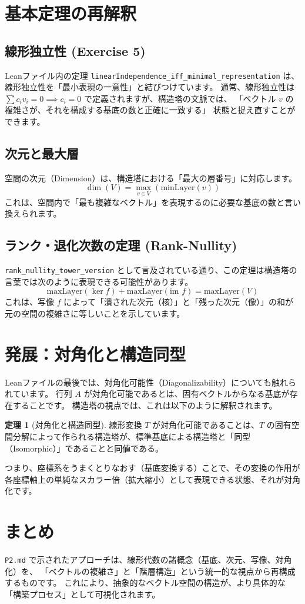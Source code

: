 \documentclass[judge=standard,11pt]{jlreq}
\theoremstyle{definition}
\newtheorem{theorem}[definition]{定理}
\newcommand{\minLayer}{\text{minLayer}}
\begin{document}
\section{基本定理の再解釈}

\subsection{線形独立性 (Exercise 5)}
Leanファイル内の定理 \texttt{linearIndependence\_iff\_minimal\_representation} は、線形独立性を「最小表現の一意性」と結びつけています。
通常、線形独立性は $\sum c_i v_i = 0 \implies c_i = 0$ で定義されますが、構造塔の文脈では、
「ベクトル $v$ の複雑さが、それを構成する基底の数と正確に一致する」
状態と捉え直すことができます。

\subsection{次元と最大層}
空間の次元（Dimension）は、構造塔における「最大の層番号」に対応します。
\[ \dim(V) = \max_{v \in V} (\minLayer(v)) \]
これは、空間内で「最も複雑なベクトル」を表現するのに必要な基底の数と言い換えられます。

\subsection{ランク・退化次数の定理 (Rank-Nullity)}
\texttt{rank\_nullity\_tower\_version} として言及されている通り、この定理は構造塔の言葉では次のように表現できる可能性があります。
\[ \text{maxLayer}(\ker f) + \text{maxLayer}(\text{im } f) = \text{maxLayer}(V) \]
これは、写像 $f$ によって「潰された次元（核）」と「残った次元（像）」の和が元の空間の複雑さに等しいことを示しています。

\section{発展：対角化と構造同型}

Leanファイルの最後では、対角化可能性（Diagonalizability）についても触れられています。
行列 $A$ が対角化可能であるとは、固有ベクトルからなる基底が存在することです。
構造塔の視点では、これは以下のように解釈されます。

\begin{theorem}[対角化と構造同型]
線形変換 $T$ が対角化可能であることは、$T$ の固有空間分解によって作られる構造塔が、標準基底による構造塔と「同型（Isomorphic）」であることと同値である。
\end{theorem}

つまり、座標系をうまくとりなおす（基底変換する）ことで、その変換の作用が各座標軸上の単純なスカラー倍（拡大縮小）として表現できる状態、それが対角化です。

\section{まとめ}
\texttt{P2.md} で示されたアプローチは、線形代数の諸概念（基底、次元、写像、対角化）を、
「ベクトルの複雑さ」と「階層構造」という統一的な視点から再構成するものです。
これにより、抽象的なベクトル空間の構造が、より具体的な「構築プロセス」として可視化されます。
\end{document}
